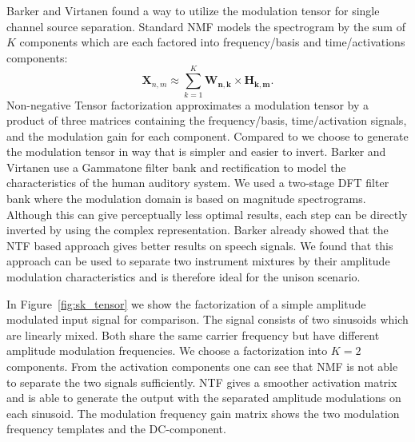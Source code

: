 
Barker and Virtanen \cite{barker13} found a way to utilize the modulation tensor for single channel source separation. Standard NMF models the spectrogram by the sum of $K$ components which are each factored into frequency/basis and time/activations components:
\begin{equation}
   \mathbf{X}_{n,m} \approx \sum_{k=1}^{K}\mathbf{W_{n,k}}\times \mathbf{H_{k,m}}.
\end{equation}
Non-negative Tensor factorization approximates a modulation tensor by a product of three matrices containing the frequency/basis, time/activation signals, and the modulation gain for each component. Compared to \cite{barker13} we choose to generate the modulation tensor in way that is simpler and easier to invert. Barker and Virtanen use a Gammatone filter bank and  rectification to model the characteristics of the human auditory system. We used a two-stage DFT filter bank where the modulation domain is based on  magnitude spectrograms. Although this can give perceptually less optimal results, each step can be directly inverted by using the complex representation. Barker already showed that the NTF based approach gives better results on speech signals. We found that this approach can be used to separate two instrument mixtures by their amplitude modulation characteristics and is therefore ideal for the unison scenario.

In Figure~\ref{fig:sk_tensor} we show the factorization of a simple amplitude modulated input signal for comparison. The signal consists of two sinusoids which are linearly mixed. Both share the same carrier frequency but have different amplitude modulation frequencies. We choose a factorization into $K=2$ components. From the activation components one can see that NMF is not able to separate the two signals sufficiently. NTF gives a smoother activation matrix and is able to generate the output with the separated amplitude modulations on each sinusoid. The modulation frequency gain matrix shows the two modulation frequency templates and the DC-component.

